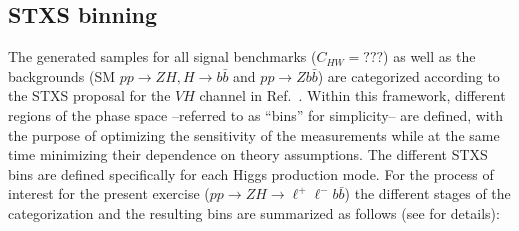 \documentclass[11pt]{cernrep}
\begin{document}
\subsection{STXS binning}

The generated samples for all signal benchmarks ($C_{HW}=???$) as well as the backgrounds (SM $pp \to ZH, H\to b\bar{b}$ and $pp\to Zb\bar{b}$) are categorized according to the STXS proposal for the $VH$ channel in Ref.~\cite{deFlorian:2016spz}. Within this framework, different regions of the phase space --referred to as ``bins'' for simplicity-- are defined, with the purpose of optimizing the sensitivity of the measurements while at the same time minimizing their dependence on theory assumptions. The different STXS bins are defined specifically for each Higgs production mode. For the process of interest
for the present exercise ($pp \to ZH \to \ell^+ \ell^- b\bar{b}$) the different stages of the categorization and the resulting bins are summarized as follows (see \cite{deFlorian:2016spz} for details):
%
\end{document}
